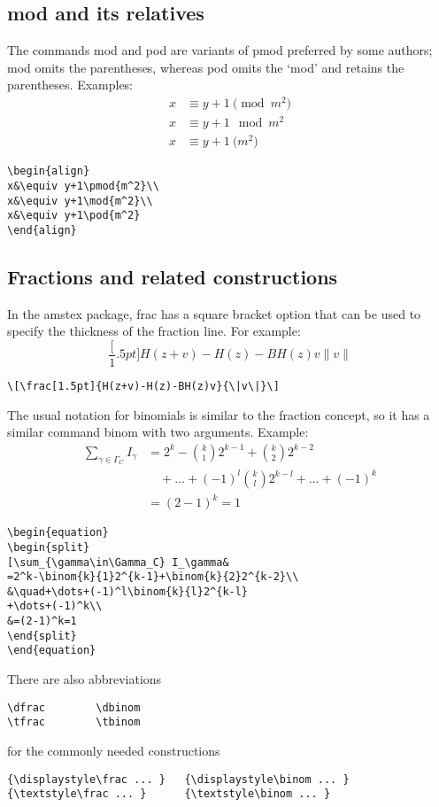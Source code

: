 \documentclass[draft]{amsart}
\newcommand{\ntt}{\normalfont\ttfamily}
\newcommand{\cn}[1]{{\protect\ntt\bslash#1}}
\newcommand{\pkg}[1]{{\protect\ntt#1}}
\theoremstyle{definition}
\theoremstyle{remark}
\begin{document}
\subsection{\cn{mod} and its relatives}
The commands \cn{mod} and \cn{pod} are variants of
\cn{pmod} preferred by some authors; \cn{mod} omits the parentheses,
whereas \cn{pod} omits the `mod' and retains the parentheses.
Examples:
\begin{align}
x&\equiv y+1\pmod{m^2}\\
x&\equiv y+1\mod{m^2}\\
x&\equiv y+1\pod{m^2}
\end{align}
\begin{verbatim}
\begin{align}
x&\equiv y+1\pmod{m^2}\\
x&\equiv y+1\mod{m^2}\\
x&\equiv y+1\pod{m^2}
\end{align}
\end{verbatim}

\subsection{Fractions and related constructions}
\label{fracs}
In the \pkg{amstex} package,
\cn{frac} has a square bracket option that can be used
to specify the thickness of the fraction line.  For example:
\[\frac[1.5pt]{H(z+v)-H(z)-BH(z)v}{\|v\|}\]
\begin{verbatim}
\[\frac[1.5pt]{H(z+v)-H(z)-BH(z)v}{\|v\|}\]
\end{verbatim}

The usual notation for binomials is similar to the fraction concept,
so it has a similar command \cn{binom} with two arguments. Example:
\begin{equation}
\begin{split}
\sum_{\gamma\in\Gamma_C} I_\gamma&
=2^k-\binom{k}{1}2^{k-1}+\binom{k}{2}2^{k-2}\\
&\quad+\dots+(-1)^l\binom{k}{l}2^{k-l}
+\dots+(-1)^k\\
&=(2-1)^k=1
\end{split}
\end{equation}
\begin{verbatim}
\begin{equation}
\begin{split}
[\sum_{\gamma\in\Gamma_C} I_\gamma&
=2^k-\binom{k}{1}2^{k-1}+\binom{k}{2}2^{k-2}\\
&\quad+\dots+(-1)^l\binom{k}{l}2^{k-l}
+\dots+(-1)^k\\
&=(2-1)^k=1
\end{split}
\end{equation}
\end{verbatim}
There are also abbreviations
\begin{verbatim}
\dfrac        \dbinom
\tfrac        \tbinom
\end{verbatim}
for the commonly needed constructions
\begin{verbatim}
{\displaystyle\frac ... }   {\displaystyle\binom ... }
{\textstyle\frac ... }      {\textstyle\binom ... }
\end{verbatim}
\end{document}
